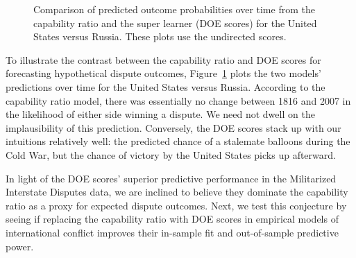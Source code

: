 \begin{figure}[tp]
  \centering
  
  \vspace{-2em}
  \caption{
    Comparison of predicted outcome probabilities over time from the capability ratio and the super learner (DOE scores) for the United States versus Russia.
    These plots use the undirected scores.
  }
  \label{fig:vs}
\end{figure}

To illustrate the contrast between the capability ratio and DOE scores for forecasting hypothetical dispute outcomes, Figure~\ref{fig:vs} plots the two models' predictions over time for the United States versus Russia.
According to the capability ratio model, there was essentially no change between 1816 and 2007 in the likelihood of either side winning a dispute.
We need not dwell on the implausibility of this prediction.
Conversely, the DOE scores stack up with our intuitions relatively well: the predicted chance of a stalemate balloons during the Cold War, but the chance of victory by the United States picks up afterward.

In light of the DOE scores' superior predictive performance in the Militarized Interstate Disputes data, we are inclined to believe they dominate the capability ratio as a proxy for expected dispute outcomes.
Next, we test this conjecture by seeing if replacing the capability ratio with DOE scores in empirical models of international conflict improves their in-sample fit and out-of-sample predictive power.

